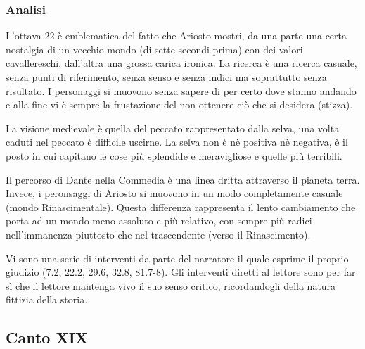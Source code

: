 \documentclass[a4paper]{article}
\begin{document}

\subsubsection{Analisi}

L'ottava 22 è emblematica del fatto che Ariosto mostri, da una parte una
certa nostalgia di un vecchio mondo (di sette secondi prima) con dei valori cavallereschi,
dall'altra una grossa carica ironica.
La ricerca è una ricerca casuale, senza punti di riferimento, senza senso e senza indici
ma soprattutto senza risultato.
I personaggi si muovono senza sapere di per certo dove stanno andando
e alla fine vi è sempre la frustazione del non ottenere ciò che si desidera (stizza).

La visione medievale è quella del peccato rappresentato dalla selva, una volta caduti
nel peccato è difficile uscirne. La selva non è nè positiva nè negativa, è il posto
in cui capitano le cose più splendide e meravigliose e quelle più terribili.

Il percorso di Dante nella Commedia è una linea dritta attraverso il pianeta terra.
Invece, i peronsaggi di Ariosto si muovono in un modo completamente casuale (mondo Rinascimentale).
Questa differenza rappresenta il lento cambiamento che porta ad un mondo meno assoluto e più relativo,
con sempre più radici nell'immanenza piuttosto che nel trascendente (verso il Rinascimento).

Vi sono una serie di interventi da parte del narratore il quale
esprime il proprio giudizio (7.2, 22.2, 29.6, 32.8, 81.7-8).
Gli interventi diretti al lettore sono per far sì che il lettore mantenga vivo il suo senso critico, ricordandogli
della natura fittizia della storia.

\subsection{Canto XIX}
\end{document}
